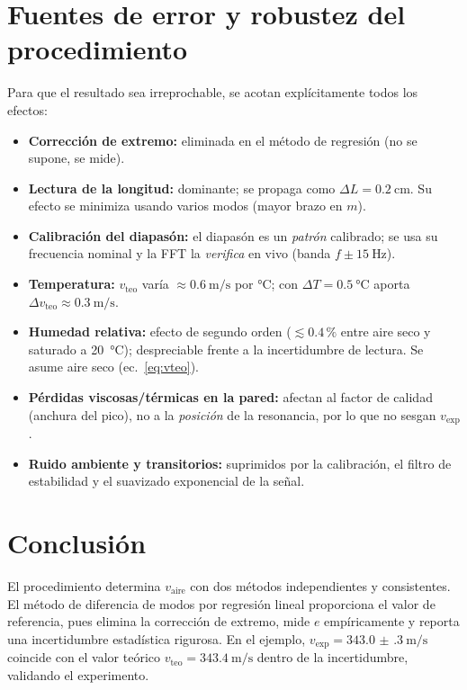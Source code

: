 \documentclass[11pt,a4paper]{article}
\newcommand{\vsound}{v_{\text{aire}}}
\newcommand{\vexp}{v_{\text{exp}}}
\newcommand{\vteo}{v_{\text{teo}}}
\begin{document}
\section{Fuentes de error y robustez del procedimiento}
Para que el resultado sea irreprochable, se acotan explícitamente todos los efectos:
\begin{itemize}[nosep]
  \item \textbf{Corrección de extremo:} eliminada en el método de regresión (no se supone, se mide).
  \item \textbf{Lectura de la longitud:} dominante; se propaga como $\Delta L=\SI{0.2}{\centi\meter}$.
        Su efecto se minimiza usando varios modos (mayor brazo en $m$).
  \item \textbf{Calibración del diapasón:} el diapasón es un \emph{patrón} calibrado; se usa su
        frecuencia nominal y la FFT la \emph{verifica} en vivo (banda $f\pm\SI{15}{\hertz}$).
  \item \textbf{Temperatura:} $\vteo$ varía $\approx\SI{0.6}{\meter\per\second}$ por
        \si{\celsius}; con $\Delta T=\SI{0.5}{\celsius}$ aporta $\Delta\vteo\approx\SI{0.3}{\meter\per\second}$.
  \item \textbf{Humedad relativa:} efecto de segundo orden ($\lesssim 0.4\,\%$ entre aire seco y
        saturado a \SI{20}{\celsius}); despreciable frente a la incertidumbre de lectura. Se
        asume aire seco (ec.~\eqref{eq:vteo}).
  \item \textbf{Pérdidas viscosas/térmicas en la pared:} afectan al factor de calidad (anchura
        del pico), no a la \emph{posición} de la resonancia, por lo que no sesgan $\vexp$.
  \item \textbf{Ruido ambiente y transitorios:} suprimidos por la calibración, el filtro de
        estabilidad y el suavizado exponencial de la señal.
\end{itemize}

\section{Conclusión}
El procedimiento determina $\vsound$ con dos métodos independientes y consistentes. El método de
diferencia de modos por regresión lineal proporciona el valor de referencia, pues elimina la
corrección de extremo, mide $e$ empíricamente y reporta una incertidumbre estadística rigurosa.
En el ejemplo, $\vexp=\SI{343.0(3)}{\meter\per\second}$ coincide con el valor teórico
$\vteo=\SI{343.4}{\meter\per\second}$ dentro de la incertidumbre, validando el experimento.
\end{document}

